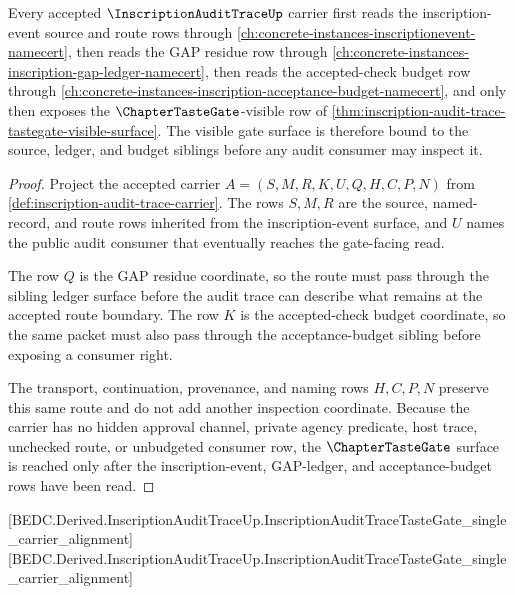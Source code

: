 \begin{theorem}
\label{thm:inscription-audit-trace-budget-ledger-sibling-route}
Every accepted $\InscriptionAuditTraceUp$ carrier first reads the inscription-event source and route rows through \autoref{ch:concrete-instances-inscriptionevent-namecert}, then reads the GAP residue row through \autoref{ch:concrete-instances-inscription-gap-ledger-namecert}, then reads the accepted-check budget row through \autoref{ch:concrete-instances-inscription-acceptance-budget-namecert}, and only then exposes the $\ChapterTasteGate$-visible row of \autoref{thm:inscription-audit-trace-tastegate-visible-surface}. The visible gate surface is therefore bound to the source, ledger, and budget siblings before any audit consumer may inspect it.
\end{theorem}
\begin{proof}
Project the accepted carrier $A=(S,M,R,K,U,Q,H,C,P,N)$ from \autoref{def:inscription-audit-trace-carrier}. The rows $S,M,R$ are the source, named-record, and route rows inherited from the inscription-event surface, and $U$ names the public audit consumer that eventually reaches the gate-facing read.

The row $Q$ is the GAP residue coordinate, so the route must pass through the sibling ledger surface before the audit trace can describe what remains at the accepted route boundary. The row $K$ is the accepted-check budget coordinate, so the same packet must also pass through the acceptance-budget sibling before exposing a consumer right.

The transport, continuation, provenance, and naming rows $H,C,P,N$ preserve this same route and do not add another inspection coordinate. Because the carrier has no hidden approval channel, private agency predicate, host trace, unchecked route, or unbudgeted consumer row, the $\ChapterTasteGate$ surface is reached only after the inscription-event, GAP-ledger, and acceptance-budget rows have been read.
\end{proof}

[BEDC.Derived.InscriptionAuditTraceUp.InscriptionAuditTraceTasteGate\_single\_carrier\_alignment]
[BEDC.Derived.InscriptionAuditTraceUp.InscriptionAuditTraceTasteGate\_single\_carrier\_alignment]

